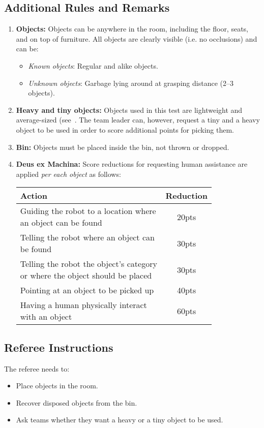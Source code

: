 \subsection*{Additional Rules and Remarks}
\begin{enumerate}[nosep]
	\item \textbf{Objects:}
	Objects can be anywhere in the room, including the floor, seats, and on top of furniture.
	All objects are clearly visible (i.e. no occlusions) and can be:
	\begin{itemize}[nosep]
		\item\textit{Known objects}: Regular and alike objects.    
    \item\textit{Unknown objects}: Garbage lying around at grasping distance (2--3 objects).
	\end{itemize}

	\item \textbf{Heavy and tiny objects:} Objects used in this test are lightweight and average-sized (see~.
	The team leader can, however, request a tiny and a heavy object to be used in order to score additional points for picking them.

	\item \textbf{Bin:} Objects must be placed inside the bin, not thrown or dropped.

	\item \textbf{Deus ex Machina:} Score reductions for requesting human assistance are applied \emph{per each object} as follows:
	\begin{table}[h]
		\begin{tabular}{m{0.8\linewidth} c}
			\textbf{Action} & \textbf{Reduction} \\\hline
			Guiding the robot to a location where an object can be found & 20pts \\
			Telling the robot where an object can be found & 30pts \\
			Telling the robot the object's category or where the object should be placed & 30pts \\
			Pointing at an object to be picked up & 40pts \\
			Having a human physically interact with an object & 60pts \\\hline
		\end{tabular}
	\end{table}
\end{enumerate}

\subsection*{Referee Instructions}
The referee needs to:
\begin{itemize}
	\item Place objects in the room.
	\item Recover disposed objects from the bin.
	\item Ask teams whether they want a heavy or a tiny object to be used.
\end{itemize}

